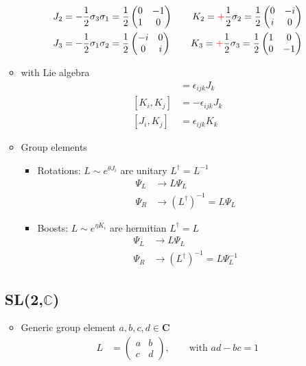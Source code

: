 \documentclass[../main.tex]{subfiles}
\begin{document}
\begin{itemize}
\begin{itemize}
\begin{align}
J_2&=-\frac{1}{2}\sigma_3\sigma_1=\frac{1}{2}\left(\begin{matrix}0&-1\\1&0\end{matrix}\right)\qquad
K_2=\textcolor{red}{+}\frac{1}{2}\sigma_2=\frac{1}{2}\left(\begin{matrix}0&-i\\i&0\end{matrix}\right)\\
J_3&=-\frac{1}{2}\sigma_1\sigma_2=\frac{1}{2}\left(\begin{matrix}-i&0\\0&i\end{matrix}\right)\qquad
K_3=\textcolor{red}{+}\frac{1}{2}\sigma_3=\frac{1}{2}\left(\begin{matrix}1&0\\0&-1\end{matrix}\right)
\end{align}
\item with Lie algebra
\begin{align}
[J_i,J_j]&=\epsilon_{ijk}J_k\\
[K_i,K_j]&=-\epsilon_{ijk}J_k\\
[J_i,K_j]&=\epsilon_{ijk}K_k
\end{align}
\item Group elements
\begin{itemize}
\item Rotations: $L\sim e^{\theta J_i}$ are unitary $L^\dagger=L^{-1}$
\begin{align}
\Psi_{L}&\rightarrow L \Psi_L\\
\Psi_{R}&\rightarrow (L^\dagger)^{-1}=L \Psi_L
\end{align}
\item Boosts: $L\sim e^{\eta K_i}$ are hermitian $L^\dagger=L$
\begin{align}
\Psi_{L}&\rightarrow L \Psi_L\\
\Psi_{R}&\rightarrow (L^\dagger)^{-1}=L \Psi_L^{-1}
\end{align}
\end{itemize}

\end{itemize}


\subsection{SL(2,$\mathbb{C}$)}
\begin{itemize}
\item Generic group element $a, b, c, d\in \mathbf{C}$
\begin{align}
L
&=\left(
\begin{matrix}
a & b\\
c & d
\end{matrix}
\right), \qquad\text{with } ad-bc=1
\end{align}


\end{itemize}
\end{itemize}
\end{document}
